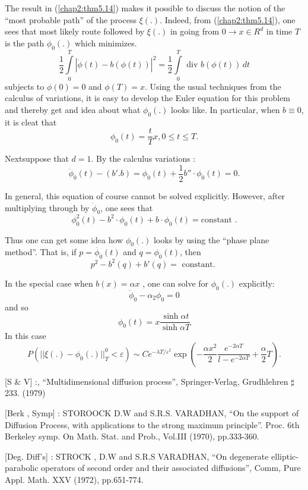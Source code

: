\setcounter{remark}{14}
\begin{remark}%
The result in (\ref{chap2:thm5.14}) makes it possible to discuss the notion of the
``most probable path''  of the process $\xi (.)$. Indeed, from
(\ref{chap2:thm5.14}), 
one sees that most likely route followed by $\xi (.)$ in going from $
0 \to x \in R^d$ in time $T$ is the path $\phi_0(.)$ which
minimizes.  
$$
\frac{1}{2} \int\limits_0^T |\dot{\phi} (t) - b (\phi (t))|^2 = \frac{1}{2}
\int\limits_0^T \text{ div } b (\phi (t)) \, dt 
$$
subjects to $\phi (0)= 0$ and $ \phi (T) = x$. Using the usual
techniques from the calculus of variations, it is easy to develop the
Euler equation for this problem and thereby get and idea about what
$\phi _0 (.)$ looks like. In particular, when $b \equiv 0$, it is
cleat that  
$$
\phi_0 (t) = \frac{t}{T}x, 0 \leq t \leq T.
$$

Next\pageoriginale suppose that $d = 1$. By the calculus variations : 
$$
\ddot{\phi}_0(t) - (b'. b) = \phi_0 (t) + \frac{1}{2}b''  \cdot \phi_0
(t) = 0. 
$$

In general, this equation of course cannot be solved explicitly.
However, after multiplying through by $\dot{\phi}_0$, one sees that  
$$
\phi^2_0 (t) - b^2 \cdot \phi_0(t) + b \cdot \phi_0(t) = \text{
  constant }.  
$$

Thus one can get some idea how $\phi_0 (.)$ looks by using the ``phase
plane method''. That is, if $p = \dot{\phi_0}(t)$ and $q = 
\phi_0(t)$, then  
$$
p^2 - b^2 (q) + b' (q) = \text{ constant. } 
$$

In the special case when $b(x) = \alpha x$ , one can solve for $\phi
_0(.)$ explicitly:  
$$
\ddot{\phi}_0- \alpha_2\phi_0 = 0 
$$
and so 
$$
\phi_0(t) = x \frac{\sinh \alpha t}{\sinh \alpha T} 
$$
In this case 
$$
P (|| \xi (.) - \phi_0 (.)||^0_T < \varepsilon) \sim C e^{-\lambda T
  /\varepsilon^2}\exp (- \frac{\alpha x^2}{2}\frac{e^{- 2 \alpha
    T}}{l-e^{- 2  \alpha T}} + \frac{\alpha}{2} T). 
$$
\end{remark}

\begin{thebibliography}{99}
 [S \& V] :,
  ``Multidimensional diffusion process'', Springer-Verlag, Grudhlehren
  $\sharp$ 233. (1979)  

 [Berk , Symp] : STOROOCK D.W and S.R.S. VARADHAN,  ``On the
  support of Diffusion Process, with applications to the strong
  maximum principle''. Proc. 6th Berkeley symp. On Math. Stat. and
  Prob., Vol.III (1970), pp.333-360.   

 [Deg. Diff's] : STROCK , D.W and S.R.S VARADHAN, ``On 
  degenerate elliptic-parabolic operators of second order and their
  associated diffusions'', Comm, Pure Appl. Math. XXV (1972), pp.651-774. 
\end{thebibliography}



